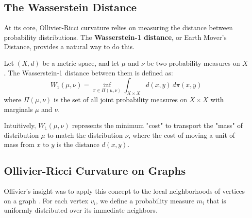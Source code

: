 \subsection{The Wasserstein Distance}
At its core, Ollivier-Ricci curvature relies on measuring the distance between probability distributions. The \textbf{Wasserstein-1 distance}, or Earth Mover's Distance, provides a natural way to do this.

\begin{definition}
Let $(X, d)$ be a metric space, and let $\mu$ and $\nu$ be two probability measures on $X$. The Wasserstein-1 distance between them is defined as:
\begin{equation}
    W_1(\mu, \nu) = \inf_{\pi \in \Pi(\mu, \nu)} \int_{X \times X} d(x,y) \, d\pi(x,y)
\end{equation}
where $\Pi(\mu, \nu)$ is the set of all joint probability measures on $X \times X$ with marginals $\mu$ and $\nu$.
\end{definition}
Intuitively, $W_1(\mu, \nu)$ represents the minimum "cost" to transport the "mass" of distribution $\mu$ to match the distribution $\nu$, where the cost of moving a unit of mass from $x$ to $y$ is the distance $d(x,y)$.

\subsection{Ollivier-Ricci Curvature on Graphs}
Ollivier's insight was to apply this concept to the local neighborhoods of vertices on a graph \citep{ollivier2009ricci}. For each vertex $v_i$, we define a probability measure $m_i$ that is uniformly distributed over its immediate neighbors.


